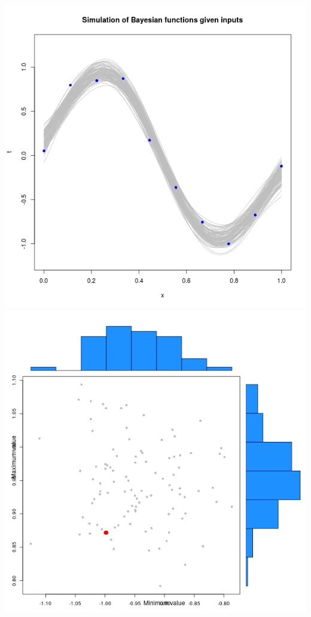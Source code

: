 \documentclass[a4paper, 11pt]{article}
\begin{document}
\begin{center}
\includegraphics[scale=0.6]{ps2_plot4.png}
\includegraphics[scale=0.5]{ps2_plot5.png}
\end{center}
\end{document}
